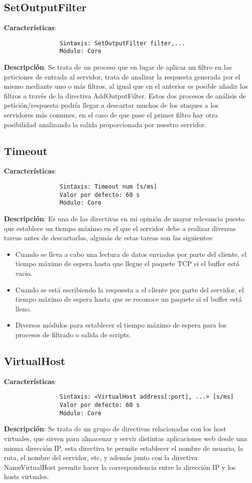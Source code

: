 \documentclass[a4paper, 11pt]{article} %
\begin{document}
	\subsection{SetOutputFilter}
	\textbf{Características}:
	\begin{verbatim}
				Sintaxis: SetOutputFilter filter,...
				Módulo: Core
	\end{verbatim}
	\textbf{Descripción}: Se trata de un proceso que en lugar de aplicar un filtro en las peticiones de entrada al servidor, trata de analizar la respuesta generada por el mismo mediante uno o más filtros, al igual que en el anterior es posible añadir los filtros a través de la directiva AddOutputFilter. Estos dos procesos de análisis de petición/respuesta podría llegar a descartar muchos de los ataques a los servidores más comunes, en el caso de que pase el primer filtro hay otra posibilidad analizando la salida proporcionada por nuestro servidor.
	\subsection{Timeout}
	\textbf{Características}:
	\begin{verbatim}
				Sintaxis: Timeout num [s/ms]
				Valor por defecto: 60 s
				Módulo: Core
	\end{verbatim}
	\textbf{Descripción}: Es una de las directivas en mi opinión de mayor relevancia puesto que establece un tiempo máximo en el que el servidor debe a realizar diversas tareas antes de descartarlas, algunás de estas tareas son las siguientes:
	\begin{itemize}
		\item Cuando se lleva a cabo una lectura de datos enviados por parte del cliente, el tiempo máximo de espera hasta que llegue el paquete TCP si el buffer está vacio.
		\item Cuando se está escribiendo la respuesta a el cliente por parte del servidor, el tiempo máximo de espera hasta que se reconoce un paquete si el buffer está lleno.
		\item Diversos módulos para establecer el tiempo máximo de espera para los procesos de filtrado o salida de scripts.
	\end{itemize}
	\subsection{VirtualHost}
	\textbf{Características}:
	\begin{verbatim}
				Sintaxis: <VirtualHost address[:port], ...> [s/ms]
				Valor por defecto: 60 s
				Módulo: Core
	\end{verbatim}
	\textbf{Descripción}: Se trata de un grupo de directivas relacionadas con los host virtuales, que sirven para almacenar y servir distintas aplicaciones web desde una misma dirección IP, esta directiva te permite establecer el nombre de usuario, la ruta, el nombre del servidor, etc, y además junto con la directiva NameVirtualHost permite hacer la correspondencia entre la dirección IP y los hosts virtuales.
	
\end{document}
